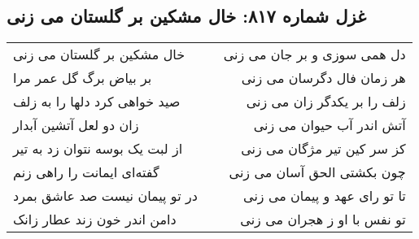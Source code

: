 \begin{center}
\section*{غزل شماره ۸۱۷: خال مشکین بر گلستان می زنی}
\label{sec:817}
\begin{longtable}{l p{0.5cm} r}
خال مشکین بر گلستان می زنی
&&
دل همی سوزی و بر جان می زنی
\\
بر بیاض برگ گل عمر مرا
&&
هر زمان فال دگرسان می زنی
\\
صید خواهی کرد دلها را به زلف
&&
زلف را بر یکدگر زان می زنی
\\
زان دو لعل آتشین آبدار
&&
آتش اندر آب حیوان می زنی
\\
از لبت یک بوسه نتوان زد به تیر
&&
کز سر کین تیر مژگان می زنی
\\
گفته‌ای ایمانت را راهی زنم
&&
چون بکشتی الحق آسان می زنی
\\
در تو پیمان نیست صد عاشق بمرد
&&
تا تو رای عهد و پیمان می زنی
\\
دامن اندر خون زند عطار زانک
&&
تو نفس با او ز هجران می زنی
\\
\end{longtable}
\end{center}
